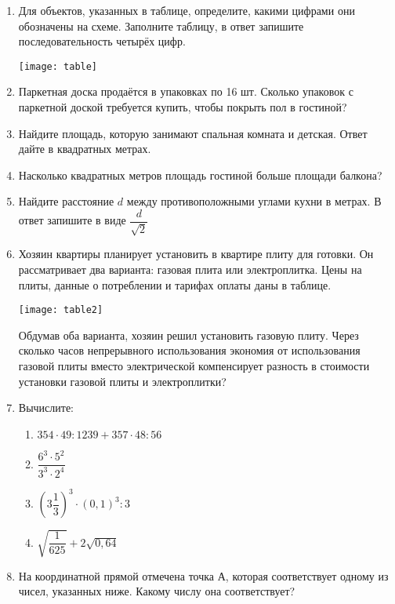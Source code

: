 \documentclass[12pt, a4paper]{article}
\begin{document}
	\begin{enumerate}
		\item Для объектов, указанных в таблице, определите, какими цифрами они обозначены на схеме. Заполните таблицу, в ответ запишите последовательность четырёх цифр.
		\begin{center}
			\texttt{[image: table]}
		\end{center}
		\item Паркетная доска продаётся в упаковках по 16 шт. Сколько упаковок с паркетной доской требуется купить, чтобы покрыть пол в гостиной?
		\item Найдите площадь, которую занимают спальная комната и детская. Ответ дайте в квадратных метрах.
		\item Насколько квадратных метров площадь гостиной больше площади балкона?
		\item Найдите расстояние $d$ между противоположными углами кухни в метрах. В ответ запишите в виде $\dfrac{d}{\sqrt{2}}$
		\item Хозяин квартиры планирует установить в квартире плиту для готовки. Он рассматривает два варианта:
		газовая плита или электроплитка. Цены на плиты, данные о потреблении и тарифах оплаты даны в таблице.
		\begin{center}
			\texttt{[image: table2]}
		\end{center}
		Обдумав оба варианта, хозяин решил установить газовую плиту. Через сколько часов непрерывного
		использования экономия от использования газовой плиты вместо электрической компенсирует разность в
		стоимости установки газовой плиты и электроплитки?
		\newpage
		\item Вычислите:
		\begin{multicols}{2}
			\begin{enumerate}[label=\asbuk*)]
				\item $354\cdot 49:1239+357\cdot48:56$
				\item $\dfrac{6^3\cdot5^2}{3^3\cdot2^4}$
				\item $\left(3\dfrac{1}{3}\right)^3\cdot(0,1)^3:3$
				\item $\sqrt{\dfrac{1}{625}}+2\sqrt{0,64}$
			\end{enumerate}
		\end{multicols}
		\item На координатной прямой отмечена точка А, которая соответствует одному из чисел, указанных ниже. Какому числу она соответствует?
		\begin{center}

\end{center}
\end{enumerate}
\end{document}
